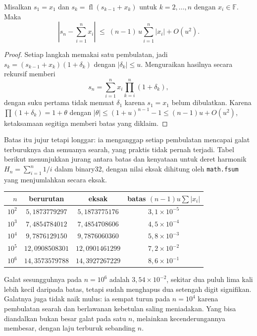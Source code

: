 \begin{teorema}
Misalkan $s_{1}=x_{1}$ dan $s_{k}=\operatorname{fl}(s_{k-1}+x_{k})$ untuk
$k=2,\dots,n$ dengan $x_{i}\in\mathbb{F}$. Maka
\[
  \left|s_{n}-\sum_{i=1}^{n}x_{i}\right|
  \;\le\;(n-1)\,u\sum_{i=1}^{n}|x_{i}|+O(u^{2}).
\]
\end{teorema}

\begin{proof}
Setiap langkah memakai satu pembulatan, jadi $s_{k}=(s_{k-1}+x_{k})(1+\delta_{k})$
dengan $|\delta_{k}|\le u$. Menguraikan hasilnya secara rekursif memberi
\[
  s_{n}=\sum_{i=1}^{n}x_{i}\prod_{k=i}^{n}(1+\delta_{k}),
\]
dengan suku pertama tidak memuat $\delta_{1}$ karena $s_{1}=x_{1}$ belum dibulatkan.
Karena $\prod(1+\delta_{k})=1+\theta$ dengan
$|\theta|\le(1+u)^{n-1}-1\le(n-1)u+O(u^{2})$, ketaksamaan segitiga memberi batas yang
diklaim.
\end{proof}

Batas itu jujur tetapi longgar: ia menganggap setiap pembulatan mencapai galat
terburuknya dan semuanya searah, yang praktis tidak pernah terjadi. Tabel berikut
menunjukkan jurang antara batas dan kenyataan untuk deret harmonik
$H_{n}=\sum_{i=1}^{n}1/i$ dalam binary32, dengan nilai eksak dihitung oleh
\texttt{math.fsum} yang menjumlahkan secara eksak.

\begin{center}
\begin{tabular}{rccc}
\hline
$n$ & berurutan & eksak & batas $(n-1)u\sum|x_{i}|$ \\
\hline
$10^{2}$  & $5{,}1873779297$ & $5{,}1873775176$ & $3{,}1\times10^{-5}$ \\
$10^{3}$  & $7{,}4854784012$ & $7{,}4854708606$ & $4{,}5\times10^{-4}$ \\
$10^{4}$  & $9{,}7876129150$ & $9{,}7876060360$ & $5{,}8\times10^{-3}$ \\
$10^{5}$  & $12{,}0908508301$ & $12{,}0901461299$ & $7{,}2\times10^{-2}$ \\
$10^{6}$  & $14{,}3573579788$ & $14{,}3927267229$ & $8{,}6\times10^{-1}$ \\
\hline
\end{tabular}
\end{center}

Galat sesungguhnya pada $n=10^{6}$ adalah $3{,}54\times10^{-2}$, sekitar dua puluh lima
kali lebih kecil daripada batas, tetapi sudah menghapus dua setengah digit signifikan.
Galatnya juga tidak naik mulus: ia sempat turun pada $n=10^{4}$ karena pembulatan
searah dan berlawanan kebetulan saling meniadakan. Yang bisa diandalkan bukan besar
galat pada satu $n$, melainkan kecenderungannya membesar, dengan laju terburuk
sebanding $n$.

